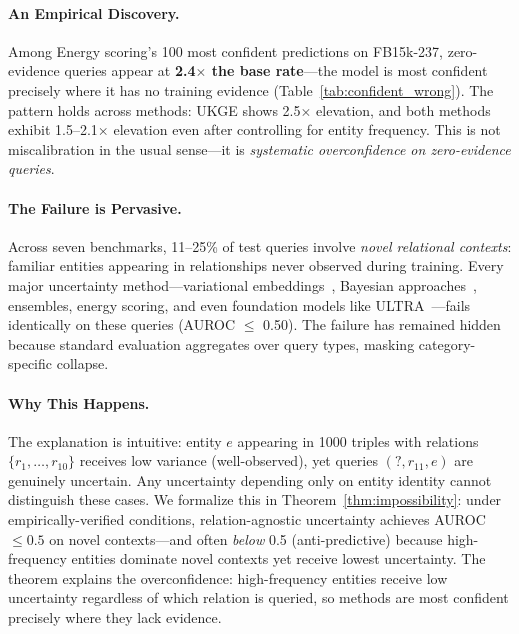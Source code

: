 
\paragraph{An Empirical Discovery.}
Among Energy scoring's 100 most confident predictions on FB15k-237, zero-evidence queries appear at \textbf{2.4$\times$ the base rate}---the model is most confident precisely where it has no training evidence (Table~\ref{tab:confident_wrong}). The pattern holds across methods: UKGE shows 2.5$\times$ elevation, and both methods exhibit 1.5--2.1$\times$ elevation even after controlling for entity frequency. This is not miscalibration in the usual sense---it is \emph{systematic overconfidence on zero-evidence queries}.

\paragraph{The Failure is Pervasive.}
Across seven benchmarks, 11--25\% of test queries involve \emph{novel relational contexts}: familiar entities appearing in relationships never observed during training. Every major uncertainty method---variational embeddings~\citep{chen2019embedding,chen2021probabilistic}, Bayesian approaches~\citep{choudhary2021perm}, ensembles, energy scoring, and even foundation models like ULTRA~\citep{galkin2024ultra}---fails identically on these queries (AUROC $\leq$ 0.50). The failure has remained hidden because standard evaluation aggregates over query types, masking category-specific collapse.

\paragraph{Why This Happens.}
The explanation is intuitive: entity $e$ appearing in 1000 triples with relations $\{r_1, \ldots, r_{10}\}$ receives low variance (well-observed), yet queries $(?, r_{11}, e)$ are genuinely uncertain. Any uncertainty depending only on entity identity cannot distinguish these cases. We formalize this in Theorem~\ref{thm:impossibility}: under empirically-verified conditions, relation-agnostic uncertainty achieves AUROC $\leq 0.5$ on novel contexts---and often \emph{below} 0.5 (anti-predictive) because high-frequency entities dominate novel contexts yet receive lowest uncertainty. The theorem explains the overconfidence: high-frequency entities receive low uncertainty regardless of which relation is queried, so methods are most confident precisely where they lack evidence.

